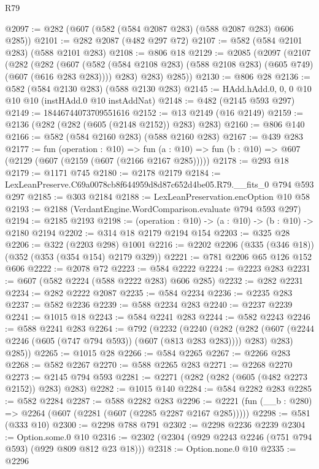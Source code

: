 \begin{lexlean}{R79}
\begin{coremodule}
@2097 := @282 (@607 (@582 (@584 @2087 @283) (@588 @2087 @283) @606 @285))
@2101 := @282 @2087 (@482 @297 @72)
@2107 := @582 (@584 @2101 @283) (@588 @2101 @283)
@2108 := @806 @18
@2129 := @2085
    (@2097
      (@2107
        (@282
          (@282
            (@607 (@582 (@584 @2108 @283) (@588 @2108 @283) (@605 @749) (@607 (@616 @283 @283))))
            @283)
          @283)
        @285))
@2130 := @806 @28
@2136 := @582 (@584 @2130 @283) (@588 @2130 @283)
@2145 := HAdd.hAdd.{0, 0, 0} @10 @10 @10 (instHAdd.{0} @10 instAddNat)
@2148 := @482 (@2145 @593 @297)
@2149 := 18446744073709551616
@2152 := @13 @2149 (@16 @2149)
@2159 := @2136 (@282 (@282 (@605 (@2148 @2152)) @283) @283)
@2160 := @806 @140
@2166 := @582 (@584 @2160 @283) (@588 @2160 @283)
@2167 := @439 @283
@2177 := fun (operation : @10) =>
  fun (a : @10) => fun (b : @10) => @607 (@2129 (@607 (@2159 (@607 (@2166 @2167 @285)))))
@2178 := @293 @18
@2179 := @1171 @745
@2180 := @2178 @2179
@2184 := LexLeanPreserve.C69a0078cb8f644959d8d87c652d4be05.R79.__fits_0 @794 @593 @297
@2185 := @303 @2184
@2188 := LexLeanPreservation.encOption @10 @58
@2193 := @2188 (VerdantEngine.WordComparison.evaluate @794 @593 @297)
@2194 := @2185 @2193
@2198 := (operation : @10) -> (a : @10) -> (b : @10) -> @2180 @2194
@2202 := @314 @18 @2179 @2194 @154
@2203 := @325 @28
@2206 := @322 (@2203 @298) @1001
@2216 := @2202 @2206 (@335 (@346 @18)) (@352 (@353 (@354 @154) @2179 @329))
@2221 := @781 @2206 @65 @126 @152 @606
@2222 := @2078 @72
@2223 := @584 @2222
@2224 := @2223 @283
@2231 := @607 (@582 @2224 (@588 @2222 @283) @606 @285)
@2232 := @282 @2231
@2234 := @282 @2222 @2087
@2235 := @584 @2234
@2236 := @2235 @283
@2237 := @582 @2236
@2239 := @588 @2234 @283
@2240 := @2237 @2239
@2241 := @1015 @18
@2243 := @584 @2241 @283
@2244 := @582 @2243
@2246 := @588 @2241 @283
@2264 := @792
    (@2232
      (@2240
        (@282 (@282 (@607 (@2244 @2246 (@605 (@747 @794 @593)) (@607 (@813 @283 @283)))) @283) @283)
        @285))
@2265 := @1015 @28
@2266 := @584 @2265
@2267 := @2266 @283
@2268 := @582 @2267
@2270 := @588 @2265 @283
@2271 := @2268 @2270
@2273 := @2145 @794 @593
@2281 := @2271 (@282 (@282 (@605 (@482 @2273 @2152)) @283) @283)
@2282 := @1015 @140
@2284 := @584 @2282 @283
@2285 := @582 @2284
@2287 := @588 @2282 @283
@2296 := @2221 (fun (__b : @280) => @2264 (@607 (@2281 (@607 (@2285 @2287 @2167 @285)))))
@2298 := @581 (@333 @10)
@2300 := @2298 @788 @791
@2302 := @2298 @2236 @2239
@2304 := Option.some.{0} @10
@2316 := @2302 (@2304 (@929 @2243 @2246 (@751 @794 @593) (@929 @809 @812 @23 @18)))
@2318 := Option.none.{0} @10
@2335 := @2296

\end{coremodule}
\end{lexlean}
